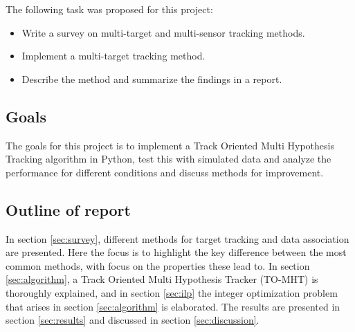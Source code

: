 The following task was proposed for this project:
\begin{itemize}
\item Write a survey on multi-target and multi-sensor tracking methods.
\item Implement a multi-target tracking method.
\item Describe the method and summarize the findings in a report.
\end{itemize}

\subsection{Goals}
The goals for this project is to implement a Track Oriented Multi Hypothesis Tracking algorithm in Python, test this with simulated data and analyze the performance for different conditions and discuss methods for improvement.

\subsection{Outline of report}
In section \ref{sec:survey}, different methods for target tracking and data association are presented. Here the focus is to highlight the key difference between the most common methods, with focus on the properties these lead to. In section \ref{sec:algorithm}, a Track Oriented Multi Hypothesis Tracker (TO-MHT) is thoroughly explained, and in section \ref{sec:ilp} the integer optimization problem that arises in section \ref{sec:algorithm} is elaborated. The results are presented in section \ref{sec:results} and discussed in section \ref{sec:discussion}.